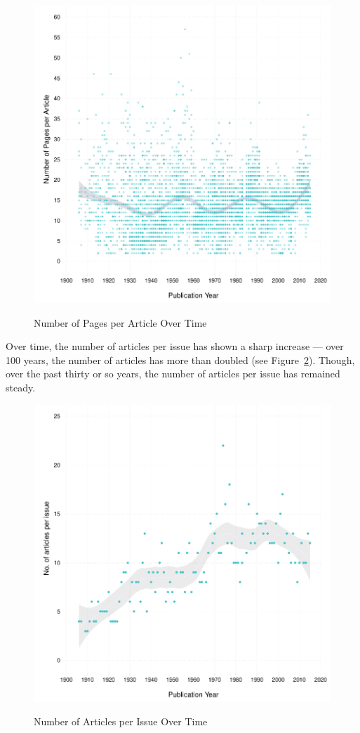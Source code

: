 \documentclass[11pt]{article}
\begin{document}
\begin{figure}[htbp]
\centering
\caption{Number of Pages per Article Over Time}
\includegraphics[scale=.85]{../figs/n_pages_per_article_over_time.pdf}
\label{fig:pages}
\end{figure}

Over time, the number of articles per issue has shown a sharp increase --- over 100 years, the number of articles has more than doubled (see Figure~\ref{fig:narticles}). Though, over the past thirty or so years, the number of articles per issue has remained steady. 

\begin{figure}[htbp]
\centering
\caption{Number of Articles per Issue Over Time}
\includegraphics[scale=.85]{../figs/articles_per_issue_over_time.pdf}
\label{fig:narticles}
\end{figure}
\end{document}
